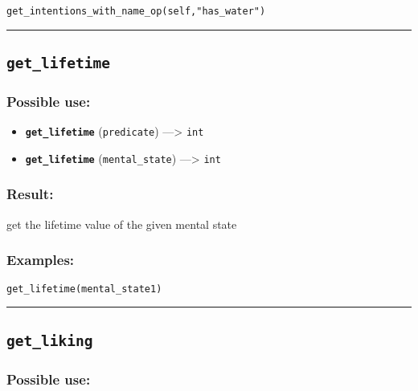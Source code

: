 \documentclass[]{book}
\providecommand{\tightlist}{%
  \setlength{\itemsep}{0pt}\setlength{\parskip}{0pt}}
\theoremstyle{definition}
\theoremstyle{definition}
\theoremstyle{definition}
\theoremstyle{remark}
\begin{document}
\begin{verbatim}
get_intentions_with_name_op(self,"has_water") 
\end{verbatim}

\begin{center}\rule{0.5\linewidth}{\linethickness}\end{center}

\subsection{\texorpdfstring{\texttt{get\_lifetime}}{get\_lifetime}}\label{get_lifetime}

\subsubsection{Possible use:}\label{possible-use-218}

\begin{itemize}
\tightlist
\item
  \textbf{\texttt{get\_lifetime}} (\texttt{predicate}) ---\textgreater{}
  \texttt{int}
\item
  \textbf{\texttt{get\_lifetime}} (\texttt{mental\_state})
  ---\textgreater{} \texttt{int}
\end{itemize}

\subsubsection{Result:}\label{result-212}

get the lifetime value of the given mental state

\subsubsection{Examples:}\label{examples-165}

\begin{verbatim}
get_lifetime(mental_state1) 
\end{verbatim}

\begin{center}\rule{0.5\linewidth}{\linethickness}\end{center}

\subsection{\texorpdfstring{\texttt{get\_liking}}{get\_liking}}\label{get_liking}

\subsubsection{Possible use:}\label{possible-use-219}
\end{document}
